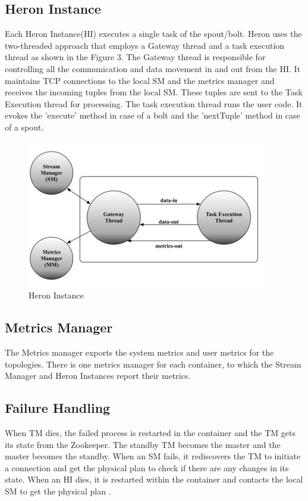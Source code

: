 \documentclass[9pt,twocolumn,twoside]{styles/osajnl}
\begin{document}
\subsection{Heron Instance}
Each Heron Instance(HI) executes a single task of the spout/bolt. Heron uses the two-threaded approach that employs a Gateway thread and a task execution thread as shown in the Figure 3. The Gateway thread is responsible for controlling all the communication and data movement in and out from the HI. It maintains TCP connections to the local SM and the metrics manager and receives the incoming tuples from the local SM. These tuples are sent to the Task Execution thread for processing. The task execution thread runs the user code. It evokes the 'execute' method in case of a bolt and the 'nextTuple' method in case of a spout.
\begin{figure}[htbp]
\begin{center}
\centering
\includegraphics[width=\linewidth]{images/img3}
\caption{Heron Instance \cite{TwitterHeron4}}
\label{fig:false-color}
\end{center}
\end{figure}
\subsection{Metrics Manager}
The Metrics manager exports the system metrics and user metrics for the topologies. There is one metrics
manager for each container, to which the Stream Manager and Heron Instances report their metrics.
\subsection{Failure Handling}
When TM dies, the failed process is restarted in the container and the TM gets its state from the Zookeeper. The standby TM becomes the master and the master becomes the standby. When an SM fails, it rediscovers the TM to initiate a connection and get the physical plan to check if there are any changes in its state. When an HI dies, it is restarted within the container and contacts the local SM to get the physical plan \cite{TwitterHeron4}.
\end{document}
